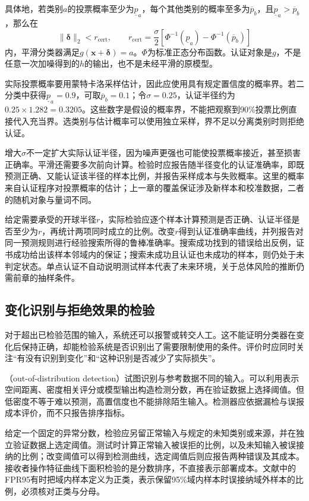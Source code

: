 具体地，若类别$a$的投票概率至少为$\underline p_a$，每个其他类别的概率至多为$\overline p_b$，且$\underline p_a>\overline p_b$，那么在
\begin{equation}
 \lVert\bm{\delta}\rVert_2<r_{\mathrm{cert}},
 \qquad
 r_{\mathrm{cert}}
 =\frac{\sigma}{2}
 \left[\Phi^{-1}(\underline p_a)
       -\Phi^{-1}(\overline p_b)\right]
 \label{eq:robustness-smoothing-radius}
\end{equation}
内，平滑分类器满足$g(\bm{x}+\bm{\delta})=a$。$\Phi$为标准正态分布函数。认证对象是$g$，不是任意一次加噪得到的$h$的输出，也不是未经平滑的原模型。

实际投票概率要用蒙特卡洛采样估计，因此应使用具有规定置信度的概率界。若二分类中获得$\underline p_a=0.9$，可取$\overline p_b=0.1$；令$\sigma=0.25$，认证半径约为$0.25\times1.282=0.3205$。这些数字是假设的概率界，不能把观察到90\%投票比例直接代入充当界。选类别与估计概率可以使用独立采样，界不足以分离类别时则拒绝认证。

增大$\sigma$不一定扩大实际认证半径，因为噪声更强也可能使投票概率接近，甚至损害正确率。平滑还需要多次前向计算。检验时应报告随半径变化的认证准确率，即既预测正确、又能认证该半径的样本比例，并报告采样成本与失败概率。这里的概率来自认证程序对投票概率的估计；上一章的覆盖保证涉及新样本和校准数据，二者的随机对象与量词不同。

给定需要承受的开球半径$r$，实际检验应逐个样本计算预测是否正确、认证半径是否至少为$r$，再统计两项同时成立的比例。改变$r$得到认证准确率曲线，并列报告对同一预测规则进行经验搜索所得的鲁棒准确率。搜索成功找到的错误给出反例，证书成功给出该样本邻域内的保证；搜索未成功且认证也未成功的样本，则仍处于未判定状态。单点认证不自动说明测试样本代表了未来环境，关于总体风险的推断仍需前章的抽样条件。

\subsection{变化识别与拒绝效果的检验}
\label{sec:robustness-monitor-test}

对于超出已检验范围的输入，系统还可以报警或转交人工。这不能证明分类器在变化后保持正确，却能检验系统是否识别出了需要限制使用的条件。评价时应同时关注“有没有识别到变化”和“这种识别是否减少了实际损失”。

（out-of-distribution detection）试图识别与参考数据不同的输入。可以利用表示空间距离、密度相关评分或模型输出构造检测分数，再在验证数据上选择阈值。但低密度不等于难以预测，高置信度也不能排除陌生输入。检测器应依据漏检与误报成本评价，而不只报告排序指标。

给定一个固定的异常分数，检验应另留正常输入与规定的未知类别或来源，并在独立验证数据上选定阈值。测试时计算正常输入被误拒的比例，以及未知输入被误接纳的比例；改变阈值可以得到检测曲线，选定阈值后则应报告两种错误及其成本。接收者操作特征曲线下面积检验的是分数排序，不直接表示部署成本。文献中的FPR95有时把域内样本定义为正类，表示保留95\%域内样本时误接纳域外样本的比例，必须核对正类与分母。

